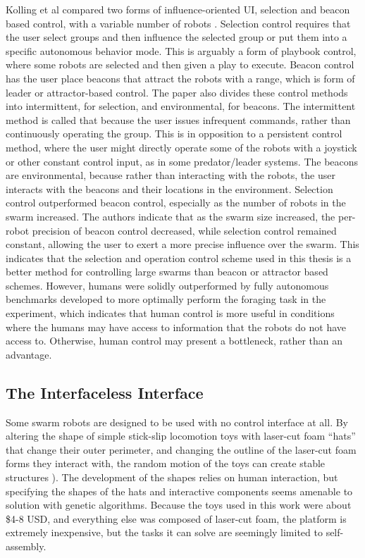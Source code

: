 Kolling et al compared two forms of influence-oriented UI, selection and beacon based control, with a variable number of robots \citep{kolling2013human}. 
Selection control requires that the user select groups and then influence the selected group or put them into a specific autonomous behavior mode. 
This is arguably a form of playbook control, where some robots are selected and then given a play to execute. 
Beacon control has the user place beacons that attract the robots with a range, which is form of leader or attractor-based control. 
The paper also divides these control methods into intermittent, for selection, and environmental, for beacons. 
The intermittent method is called that because the user issues infrequent commands, rather than continuously operating the group. 
This is in opposition to a persistent control method, where the user might directly operate some of the robots with a joystick or other constant control input, as in some predator/leader systems. 
The beacons are environmental, because rather than interacting with the robots, the user interacts with the beacons and their locations in the environment. 
Selection control outperformed beacon control, especially as the number of robots in the swarm increased. 
The authors indicate that as the swarm size increased, the per-robot precision of beacon control decreased, while selection control remained constant, allowing the user to exert a more precise influence over the swarm. 
This indicates that the selection and operation control scheme used in this thesis is a better method for controlling large swarms than beacon or attractor based schemes. 
However, humans were solidly outperformed by fully autonomous benchmarks developed to more optimally perform the foraging task in the experiment, which indicates that human control is more useful in conditions where the humans may have access to information that the robots do not have access to. 
Otherwise, human control may present a bottleneck, rather than an advantage. 

\subsection{The Interfaceless Interface} \label{section:The_Interfaceless_Interface}

Some swarm robots are designed to be used with no control interface at all.
By altering the shape of simple stick-slip locomotion toys with laser-cut foam ``hats'' that change their outer perimeter, and changing the outline of the laser-cut foam forms they interact with, the random motion of the toys can create stable structures \citep{andreen2016emergent}).
The development of the shapes relies on human interaction, but specifying the shapes of the hats and interactive components seems amenable to solution with genetic algorithms. 
Because the toys used in this work were about \$4-8 USD, and everything else was composed of laser-cut foam, the platform is extremely inexpensive, but the tasks it can solve are seemingly limited to self-assembly. 

